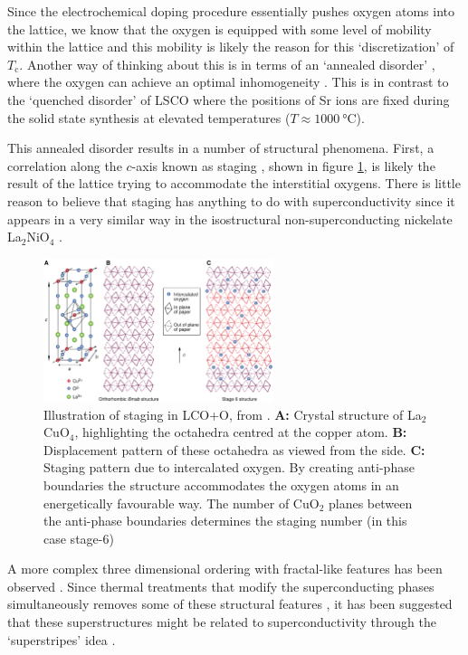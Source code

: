 Since the electrochemical doping procedure essentially pushes oxygen atoms into the lattice, we know that the oxygen is equipped with some level of mobility within the lattice and this mobility is likely the reason for this `discretization' of $T_\text{c}$. Another way of thinking about this is in terms of an `annealed disorder' \cite{Wells1997}, where the oxygen can achieve an optimal inhomogeneity \cite{Poccia2012}. This is in contrast to the `quenched disorder' \cite{Wells1997} of LSCO where the positions of Sr ions are fixed during the solid state synthesis at elevated temperatures ($T \approx \SI{1000}{\celsius}$). 

This annealed disorder results in a number of structural phenomena. First, a correlation along the $c$-axis known as staging \cite{Wells1996}, shown in figure \ref{fig:staging}, is likely the result of the lattice trying to accommodate the interstitial oxygens. There is little reason to believe that staging has anything to do with superconductivity since it appears in a very similar way in the isostructural non-superconducting nickelate La$_2$NiO$_4$ \cite{Tranquada1994}.

\begin{figure}
    \centering
    \includegraphics[width=0.6\textwidth]{fig/intro/staging.png}
    \caption[staging]{Illustration of staging in LCO+O, from \cite{Wells1997}. \textbf{A:} Crystal structure of La$_2$CuO$_4$, highlighting the octahedra centred at the copper atom. \textbf{B:} Displacement pattern of these octahedra as viewed from the side. \textbf{C:} Staging pattern due to intercalated oxygen. By creating anti-phase boundaries the structure accommodates the oxygen atoms in an energetically favourable way. The number of CuO$_2$ planes between the anti-phase boundaries determines the staging number (in this case stage-6)}
    \label{fig:staging}
\end{figure}

A more complex three dimensional ordering with fractal-like features has been observed \cite{Fratini2010, Poccia2012}. Since thermal treatments that modify the superconducting phases simultaneously removes some of these structural features \cite{Poccia2012}, it has been suggested that these superstructures might be related to superconductivity through the `superstripes' idea \cite{Bianconi2000}.

